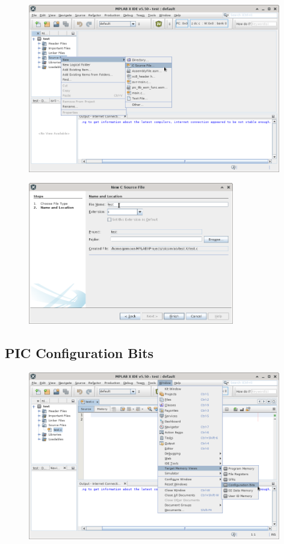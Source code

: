 \begin{figure}[H]
\center
\includegraphics[width=0.98\textwidth]{img/hmd/mplab17.png} 
\end{figure} 

\begin{figure}[H]
\center
\includegraphics[width=0.8\textwidth]{img/hmd/mplab18.png} 
\end{figure} 


\subsection{PIC Configuration Bits}
\begin{figure}[H]
\center
\includegraphics[width=0.98\textwidth]{img/hmd/mplab19.png} 
\end{figure} 

